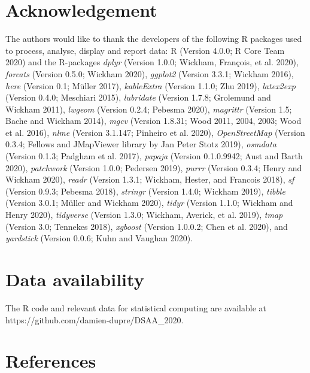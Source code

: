 \documentclass[conference,final,]{IEEEtran}
\begin{document}
\hypertarget{acknowledgement}{%
\section{Acknowledgement}\label{acknowledgement}}

The authors would like to thank the developers of the following R packages used to process, analyse, display and report data: R (Version 4.0.0; R Core Team 2020) and the R-packages \emph{dplyr} (Version 1.0.0; Wickham, François, et al. 2020), \emph{forcats} (Version 0.5.0; Wickham 2020), \emph{ggplot2} (Version 3.3.1; Wickham 2016), \emph{here} (Version 0.1; Müller 2017), \emph{kableExtra} (Version 1.1.0; Zhu 2019), \emph{latex2exp} (Version 0.4.0; Meschiari 2015), \emph{lubridate} (Version 1.7.8; Grolemund and Wickham 2011), \emph{lwgeom} (Version 0.2.4; Pebesma 2020), \emph{magrittr} (Version 1.5; Bache and Wickham 2014), \emph{mgcv} (Version 1.8.31; Wood 2011, 2004, 2003; Wood et al. 2016), \emph{nlme} (Version 3.1.147; Pinheiro et al. 2020), \emph{OpenStreetMap} (Version 0.3.4; Fellows and JMapViewer library by Jan Peter Stotz 2019), \emph{osmdata} (Version 0.1.3; Padgham et al. 2017), \emph{papaja} (Version 0.1.0.9942; Aust and Barth 2020), \emph{patchwork} (Version 1.0.0; Pedersen 2019), \emph{purrr} (Version 0.3.4; Henry and Wickham 2020), \emph{readr} (Version 1.3.1; Wickham, Hester, and Francois 2018), \emph{sf} (Version 0.9.3; Pebesma 2018), \emph{stringr} (Version 1.4.0; Wickham 2019), \emph{tibble} (Version 3.0.1; Müller and Wickham 2020), \emph{tidyr} (Version 1.1.0; Wickham and Henry 2020), \emph{tidyverse} (Version 1.3.0; Wickham, Averick, et al. 2019), \emph{tmap} (Version 3.0; Tennekes 2018), \emph{xgboost} (Version 1.0.0.2; Chen et al. 2020), and \emph{yardstick} (Version 0.0.6; Kuhn and Vaughan 2020).

\hypertarget{data-availability}{%
\section{Data availability}\label{data-availability}}

The R code and relevant data for statistical computing are available at https://github.com/damien-dupre/DSAA\_2020.

\hypertarget{references}{%
\section*{References}\label{references}}
\end{document}
